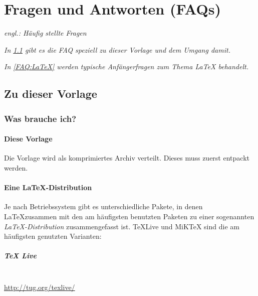 
\chapter{Fragen und Antworten (FAQs)}
	\label{sec:anhang:faq}
	\emph{engl.: Häufig stellte Fragen}
	
	\emph{In \ref{FAQ:Vorlage} gibt es die FAQ speziell zu dieser Vorlage und dem Umgang damit.}
	
	\emph{In \ref{FAQ:LaTeX} werden typische Anfängerfragen zum Thema \LaTeX{} behandelt.} 
	
	\section{Zu dieser Vorlage}\label{FAQ:Vorlage}
		\subsection{Was brauche ich?}
			\subsubsection{Diese Vorlage}
			Die Vorlage wird als komprimiertes Archiv verteilt. Dieses muss zuerst entpackt werden.
			
			\subsubsection{Eine LaTeX-Distribution}
			Je nach Betriebssystem gibt es unterschiedliche Pakete, in denen \LaTeX zusammen mit den am häufigsten benutzten Paketen zu einer sogenannten \emph{\LaTeX-Distribution} zusammengefasst ist.
%			
			\TeX Live und MiKTeX sind die am häufigsten genutzten Varianten:
			
			\paragraph{TeX Live}~\\
			     
			\hfill
			\url{http://tug.org/texlive/}
			\medskip
			
